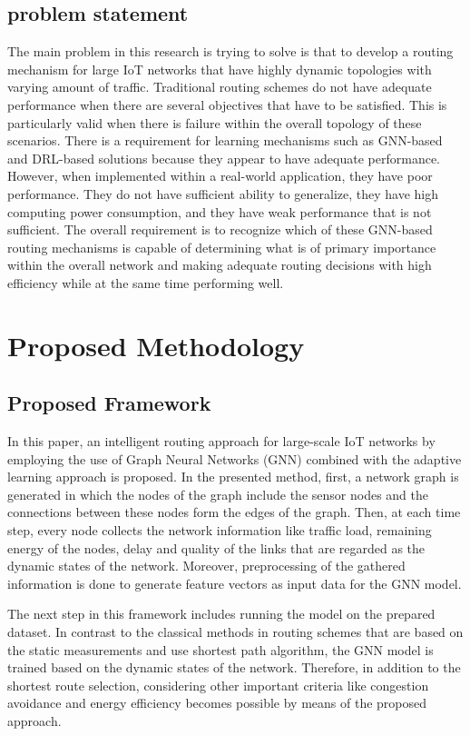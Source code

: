 \documentclass[a4paper,fleqn]{cas-dc}
\numberwithin{equation}{section}
\begin{document}
\subsection{problem statement}
The main problem in this research is trying to solve is that to develop a routing mechanism for large IoT networks that have highly dynamic topologies with varying amount of traffic. Traditional routing schemes do not have adequate performance when there are several objectives that have to be satisfied. This is particularly valid when there is failure within the overall topology of these scenarios. There is a requirement for learning mechanisms such as GNN-based and DRL-based solutions because they appear to have adequate performance. However, when implemented within a real-world application, they have poor performance. They do not have sufficient ability to generalize, they have high computing power consumption, and they have weak performance that is not sufficient. The overall requirement is to recognize which of these GNN-based routing mechanisms is capable of determining what is of primary importance within the overall network and making adequate routing decisions with high efficiency while at the same time performing well.

\section{Proposed Methodology}
\subsection{Proposed Framework}
In this paper, an intelligent routing approach for large-scale IoT networks by employing the use of Graph Neural Networks (GNN) combined with the adaptive learning approach is proposed. In the presented method, first, a network graph is generated in which the nodes of the graph include the sensor nodes and the connections between these nodes form the edges of the graph. Then, at each time step, every node collects the network information like traffic load, remaining energy of the nodes, delay and quality of the links that are regarded as the dynamic states of the network. Moreover, preprocessing of the gathered information is done to generate feature vectors as input data for the GNN model.

The next step in this framework includes running the model on the prepared dataset. In contrast to the classical methods in routing schemes that are based on the static measurements and use shortest path algorithm, the GNN model is trained based on the dynamic states of the network. Therefore, in addition to the shortest route selection, considering other important criteria like congestion avoidance and energy efficiency becomes possible by means of the proposed approach.
\end{document}
